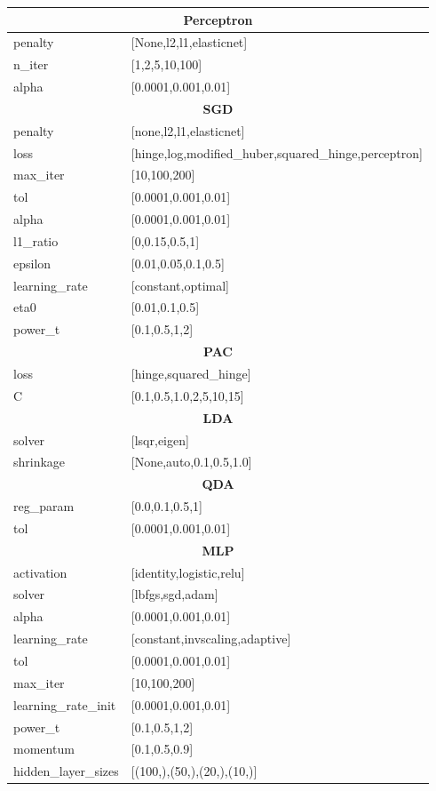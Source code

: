 {\begin{longtable}{l l}
\midrule
\multicolumn{2}{c}{\textbf{Perceptron }} \\
\midrule

penalty & [None,l2,l1,elasticnet] \\
n\_iter & [1,2,5,10,100] \\
alpha & [0.0001,0.001,0.01] \\
 
\midrule
\multicolumn{2}{c}{\textbf{SGD }} \\
\midrule

penalty & [none,l2,l1,elasticnet] \\
loss & [hinge,log,modified\_huber,squared\_hinge,perceptron] \\
max\_iter & [10,100,200] \\
tol & [0.0001,0.001,0.01] \\
alpha & [0.0001,0.001,0.01] \\
l1\_ratio & [0,0.15,0.5,1] \\
epsilon & [0.01,0.05,0.1,0.5] \\
learning\_rate & [constant,optimal] \\
eta0 & [0.01,0.1,0.5] \\
power\_t & [0.1,0.5,1,2] \\
 
\midrule
\multicolumn{2}{c}{\textbf{PAC }} \\
\midrule

loss & [hinge,squared\_hinge] \\
C & [0.1,0.5,1.0,2,5,10,15] \\
 
\midrule
\multicolumn{2}{c}{\textbf{LDA }} \\*
\midrule

solver & [lsqr,eigen] \\
shrinkage & [None,auto,0.1,0.5,1.0] \\
 
\midrule
\multicolumn{2}{c}{\textbf{QDA }} \\
\midrule

reg\_param & [0.0,0.1,0.5,1] \\
tol & [0.0001,0.001,0.01] \\
 
\midrule
\multicolumn{2}{c}{\textbf{MLP }} \\
\midrule

activation & [identity,logistic,relu] \\
solver & [lbfgs,sgd,adam] \\
alpha & [0.0001,0.001,0.01] \\
learning\_rate & [constant,invscaling,adaptive] \\
tol & [0.0001,0.001,0.01] \\
max\_iter & [10,100,200] \\
learning\_rate\_init & [0.0001,0.001,0.01] \\
power\_t & [0.1,0.5,1,2] \\
momentum & [0.1,0.5,0.9] \\
hidden\_layer\_sizes & [(100,),(50,),(20,),(10,)] \\
 

\end{longtable}}
